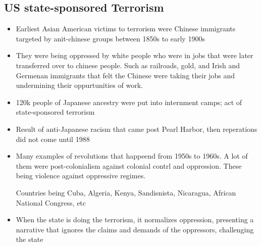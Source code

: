 \documentclass{article}
\begin{document}
\subsection{US state-sponsored Terrorism}
\begin{itemize}
\item Earliest Asian American victims to terrorism were Chinese immigrants
  targeted by anit-chinese groups between 1850s to early 1900s
\item They were being oppressed by white people who were in jobs that were later transferred over
  to chinese people. Such as railroads, gold, and Irish and Germenan immigrants
  that felt the Chinese were taking their jobs and undermining their oppurtunities of work.
\item 120k people of Japanese ancestry were put into internment camps;
  act of state-sponsored terrorism
\item Result of anti-Japanese racism that came post Pearl Harbor,
  then reperations did not come until 1988
  \item Many examples of revolutions that happeend from 1950s to 1960s.
    A lot of them were post-colonialism against colonial contrl and oppression.
    These being violence against oppressive regimes.

    Countries being Cuba, Algeria, Kenya, Sandisnista, Nicaragua, African National Congress, etc
  \item When the state is doing the terrorism, it normalizes oppression, presenting
    a narrative that ignores the claims and demands of the oppressors, challenging the state
\end{itemize}
\end{document}
